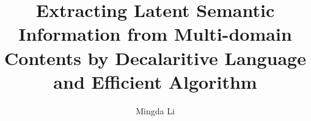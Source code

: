 \documentclass [PhD] {uclathes}
\title{Extracting Latent Semantic Information from Multi-domain Contents by Decalaritive Language and Efficient Algorithm}
\author         {Mingda Li}
\begin{document}
\makeintropages




\end{document}
